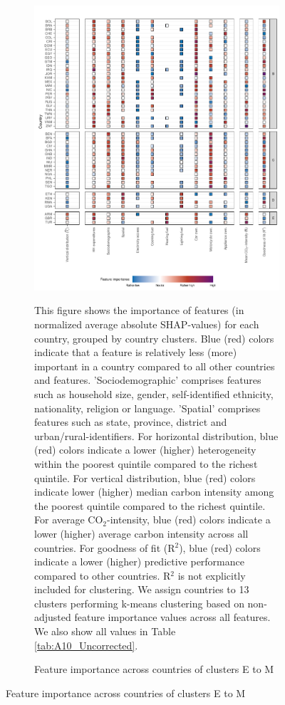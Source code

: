 \clearpage

\clearpage
\begin{figure}[ht!]\ContinuedFloat
    \centering
    \begin{subfigure}[b]{\textwidth}
    \centering
    \caption{Feature importance across countries of clusters E to M}\label{fig:fig_4_2_uncorrected}
    \includegraphics{Figure 4/Figure_4_Uncorrected_2}
    \begin{subcaption2}
    This figure shows the importance of features (in normalized average absolute SHAP-values) for each country, grouped by country clusters. Blue (red) colors indicate that a feature is relatively less (more) important in a country compared to all other countries and features. 'Sociodemographic' comprises features such as household size, gender, self-identified ethnicity, nationality, religion or language. 'Spatial' comprises features such as state, province, district and urban/rural-identifiers. For horizontal distribution, blue (red) colors indicate a lower (higher) heterogeneity within the poorest quintile compared to the richest quintile. For vertical distribution, blue (red) colors indicate lower (higher) median carbon intensity among the poorest quintile compared to the richest quintile. For average CO$_{2}$-intensity, blue (red) colors indicate a lower (higher) average carbon intensity across all countries. For goodness of fit (R$^{2}$), blue (red) colors indicate a lower (higher) predictive performance compared to other countries. R$^{2}$ is not explicitly included for clustering.
    We assign countries to 13 clusters performing k-means clustering based on non-adjusted feature importance values across all features. We also show all values in Table \ref{tab:A10_Uncorrected}.
    \end{subcaption2}
    \end{subfigure}
    
\end{figure}
\clearpage